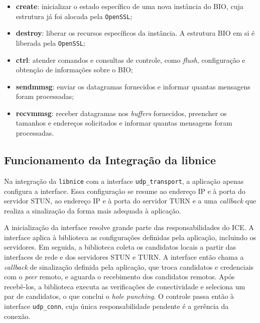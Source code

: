\begin{itemize}
    \item \textbf{create}: inicializar o estado específico de uma nova instância do BIO, cuja estrutura já foi alocada pela \texttt{OpenSSL};
    \item \textbf{destroy}: liberar os recursos específicos da instância. A estrutura BIO em si é liberada pela \texttt{OpenSSL};
    \item \textbf{ctrl}: atender comandos e consultas de controle, como \textit{flush}, configuração e obtenção de informações sobre o BIO;
    \item \textbf{sendmmsg}: enviar os datagramas fornecidos e informar quantas mensagens foram processadas;
    \item \textbf{recvmmsg}: receber datagramas nos \textit{buffers} fornecidos, preencher os tamanhos e endereços solicitados e informar quantas mensagens foram processadas.
\end{itemize}

\subsection{Funcionamento da Integração da libnice}
\label{sec:libnice_integration}

Na integração da \texttt{libnice} com a interface \texttt{udp\_transport}, a aplicação apenas configura a interface. Essa configuração se resume ao endereço IP e à porta do servidor STUN, ao endereço IP e à porta do servidor TURN e a uma \textit{callback} que realiza a sinalização da forma mais adequada à aplicação.

A inicialização da interface resolve grande parte das responsabilidades do ICE. A interface aplica à biblioteca as configurações definidas pela aplicação, incluindo os servidores. Em seguida, a biblioteca coleta os candidatos locais a partir das interfaces de rede e dos servidores STUN e TURN. A interface então chama a \textit{callback} de sinalização definida pela aplicação, que troca candidatos e credenciais com o \textit{peer} remoto, e aguarda o recebimento dos candidatos remotos. Após recebê-los, a biblioteca executa as verificações de conectividade e seleciona um par de candidatos, o que conclui o \textit{hole punching}. O controle passa então à interface \texttt{udp\_conn}, cuja única responsabilidade pendente é a gerência da conexão.

